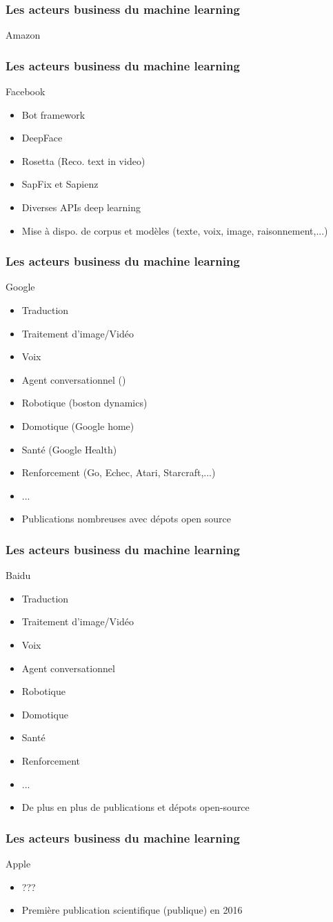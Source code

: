 \documentclass{formation}
\begin{document}
\begin{frame}
  \frametitle{Les acteurs business du machine learning}
  Amazon
\end{frame}

\begin{frame}
  \frametitle{Les acteurs business du machine learning}
  Facebook
  \begin{itemize}
  \item Bot framework
  \item DeepFace
  \item Rosetta (Reco. text in video)
  \item SapFix et Sapienz 
  \item Diverses APIs deep learning
  \item Mise à dispo. de corpus et modèles (texte, voix, image, raisonnement,...)
  \end{itemize}
\end{frame}

\begin{frame}
  \frametitle{Les acteurs business du machine learning}
  Google
  \begin{itemize}
  \item Traduction
  \item Traitement d'image/Vidéo
  \item Voix
  \item Agent conversationnel (\href{https://www.youtube.com/watch?v=d40jgFZ5hXk}{})
  \item Robotique (boston dynamics)
  \item Domotique (Google home)
  \item Santé (Google Health)
  \item Renforcement (Go, Echec, Atari, Starcraft,...)
  \item ...
  \item Publications nombreuses avec dépots open source
  \end{itemize}
\end{frame}

\begin{frame}
  \frametitle{Les acteurs business du machine learning}
  Baidu
  \begin{itemize}
  \item Traduction
  \item Traitement d'image/Vidéo
  \item Voix
  \item Agent conversationnel
  \item Robotique
  \item Domotique
  \item Santé
  \item Renforcement
  \item ...
  \item De plus en plus de publications et dépots open-source
  \end{itemize}
\end{frame}

\begin{frame}
  \frametitle{Les acteurs business du machine learning}
  Apple
  \begin{itemize}
  \item ???
  \item Première publication scientifique (publique) en 2016
  \end{itemize}
\end{frame}
\end{document}
